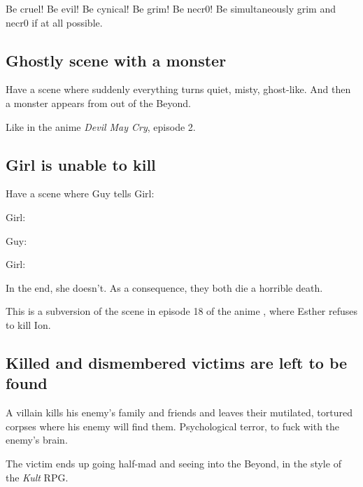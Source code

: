 Be cruel! Be evil! Be cynical! Be grim! Be necr0! Be simultaneously grim and necr0 if at all possible. 









\subsection{Ghostly scene with a monster}
Have a scene where suddenly everything turns quiet, misty, ghost-like. And then a monster appears from out of the Beyond. 

Like in the anime \emph{Devil May Cry}, episode 2. 









\subsection{Girl is unable to kill}
Have a scene where Guy tells Girl: 

Girl: 

Guy: 

Girl: 

In the end, she doesn't. As a consequence, they both die a horrible death. 

This is a subversion of the scene in episode 18 of the anime \cite{Anime:TrinityBlood}, where Esther refuses to kill Ion.









\subsection{Killed and dismembered victims are left to be found}
A villain kills his enemy's family and friends and leaves their mutilated, tortured corpses where his enemy will find them. Psychological terror, to fuck with the enemy's brain. 

The victim ends up going half-mad and seeing into the Beyond, in the style of the \emph{Kult} RPG. 









